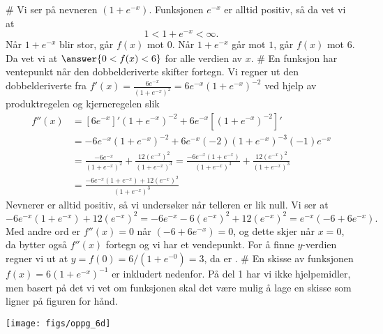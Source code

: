 \begin{easylist}[enumerate]
	# Vi ser på nevneren $(1 + e^{-x})$.
	Funksjonen $e^{-x}$ er alltid positiv, så da vet vi at
	\begin{equation*}
		1 < 1 + e^{-x} < \infty.
	\end{equation*}
	Når $1 + e^{-x}$ blir stor, går $f(x)$ mot $0$.
	Når $1 + e^{-x}$ går mot $1$, går $f(x)$ mot $6$.
	Da vet vi at $\answer{0 < f(x) < 6}$ for alle verdien av $x$.
	# En funksjon har ventepunkt når den dobbelderiverte skifter fortegn.
	Vi regner ut den dobbelderiverte fra $f'(x) = \frac{6e^{-x}}{\left(1 + e^{-x}\right)^2} = 6e^{-x} \left(1 + e^{-x}\right)^{-2} $ ved hjelp av produktregelen og kjerneregelen slik
	\begin{align*}
		f''(x) &= \left[ 6e^{-x} \right]' \left(1 + e^{-x}\right)^{-2} + 6e^{-x} \left[ \left(1 + e^{-x}\right)^{-2} \right]' \\
		&=  -6e^{-x}  \left(1 + e^{-x}\right)^{-2} + 6e^{-x} (-2)  \left(1 + e^{-x}\right)^{-3} (-1) e^{-x}  \\
		&=  \frac{-6e^{-x}}{\left(1 + e^{-x}\right)^{2}}  + \frac{12\left(e^{-x}\right)^2}{\left(1 + e^{-x}\right)^{3}} =
		 \frac{-6e^{-x} \left(1 + e^{-x}\right)}{\left(1 + e^{-x}\right)^{3}} 
		  + \frac{12\left(e^{-x}\right)^2}{\left(1 + e^{-x}\right)^{3}}\\
		 &=  \frac{-6e^{-x} \left(1 + e^{-x}\right) + 12\left(e^{-x}\right)^2}{\left(1 + e^{-x}\right)^{3}}
	\end{align*}
	Nevnerer er alltid positiv, så vi undersøker når telleren er lik null.
	Vi ser at
	\begin{equation*}
		-6e^{-x} \left(1 + e^{-x}\right) + 12\left(e^{-x}\right)^2 = 
		-6e^{-x} - 6\left(e^{-x}\right)^2 + 12\left(e^{-x}\right)^2 = 
		e^{-x} \left(-6 + 6 e^{-x}\right).
	\end{equation*}
	Med andre ord er $f''(x) = 0$ når $\left(-6 + 6 e^{-x}\right) = 0$,
	og dette skjer når $x = 0$, da bytter også $f''(x)$ fortegn og vi har et vendepunkt.
	For å finne $y$-verdien regner vi ut at $y = f(0) = 6 / (1 + e^{-0}) = 3$,
	da er .
	# En skisse av funksjonen $f(x) = 6 \left( 1 + e^{-x} \right)^{-1}$ er inkludert nedenfor. 
	På del 1 har vi ikke hjelpemidler, men basert på det vi vet om funksjonen skal det være mulig å lage en skisse som ligner på figuren for hånd.
	\begin{center}
		\texttt{[image: figs/oppg\_6d]}
	\end{center}
\end{easylist}

